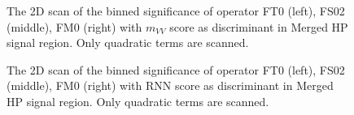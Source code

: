 \begin{figure}[ht]
    \centering
        \caption{The 2D scan of the binned significance of operator FT0 (left), FS02 (middle), FM0 (right) with $m_{VV}$ score as discriminant in Merged HP signal region. Only quadratic terms are scanned.}
        \label{fig:2lepaQGCBinnedSigMVV}
\end{figure}

\begin{figure}[ht]
    \centering
        \caption{The 2D scan of the binned significance of operator FT0 (left), FS02 (middle), FM0 (right) with RNN score as discriminant in Merged HP signal region. Only quadratic terms are scanned.}
        \label{fig:2lepaQGCBinnedSigRNN}
\end{figure}

